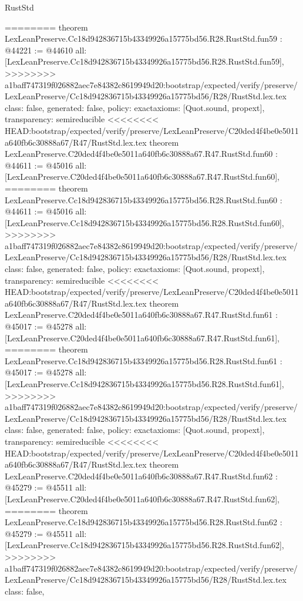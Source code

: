 \begin{lexlean}{RustStd}
\begin{coremodule}
{\begin{coremodule}
{{{{{{{{{{{{{{{{{{{{{{{{{{{{{{{{{{{{{{{{{{{{{{{{{{{{{{{{{{{{{{========
theorem LexLeanPreserve.Cc18d942836715b43349926a15775bd56.R28.RustStd.fun59 : @44221 := @44610 {
  all: [LexLeanPreserve.Cc18d942836715b43349926a15775bd56.R28.RustStd.fun59],
>>>>>>>> a1baff747319f026882aec7e84382c8619949d20:bootstrap/expected/verify/preserve/LexLeanPreserve/Cc18d942836715b43349926a15775bd56/R28/RustStd.lex.tex
  class: false,
  generated: false,
  policy: exact{axioms: [Quot.sound, propext]},
  transparency: semireducible
}
<<<<<<<< HEAD:bootstrap/expected/verify/preserve/LexLeanPreserve/C20ded4f4be0e5011a640fb6c30888a67/R47/RustStd.lex.tex
theorem LexLeanPreserve.C20ded4f4be0e5011a640fb6c30888a67.R47.RustStd.fun60 : @44611 := @45016 {
  all: [LexLeanPreserve.C20ded4f4be0e5011a640fb6c30888a67.R47.RustStd.fun60],
========
theorem LexLeanPreserve.Cc18d942836715b43349926a15775bd56.R28.RustStd.fun60 : @44611 := @45016 {
  all: [LexLeanPreserve.Cc18d942836715b43349926a15775bd56.R28.RustStd.fun60],
>>>>>>>> a1baff747319f026882aec7e84382c8619949d20:bootstrap/expected/verify/preserve/LexLeanPreserve/Cc18d942836715b43349926a15775bd56/R28/RustStd.lex.tex
  class: false,
  generated: false,
  policy: exact{axioms: [Quot.sound, propext]},
  transparency: semireducible
}
<<<<<<<< HEAD:bootstrap/expected/verify/preserve/LexLeanPreserve/C20ded4f4be0e5011a640fb6c30888a67/R47/RustStd.lex.tex
theorem LexLeanPreserve.C20ded4f4be0e5011a640fb6c30888a67.R47.RustStd.fun61 : @45017 := @45278 {
  all: [LexLeanPreserve.C20ded4f4be0e5011a640fb6c30888a67.R47.RustStd.fun61],
========
theorem LexLeanPreserve.Cc18d942836715b43349926a15775bd56.R28.RustStd.fun61 : @45017 := @45278 {
  all: [LexLeanPreserve.Cc18d942836715b43349926a15775bd56.R28.RustStd.fun61],
>>>>>>>> a1baff747319f026882aec7e84382c8619949d20:bootstrap/expected/verify/preserve/LexLeanPreserve/Cc18d942836715b43349926a15775bd56/R28/RustStd.lex.tex
  class: false,
  generated: false,
  policy: exact{axioms: [Quot.sound, propext]},
  transparency: semireducible
}
<<<<<<<< HEAD:bootstrap/expected/verify/preserve/LexLeanPreserve/C20ded4f4be0e5011a640fb6c30888a67/R47/RustStd.lex.tex
theorem LexLeanPreserve.C20ded4f4be0e5011a640fb6c30888a67.R47.RustStd.fun62 : @45279 := @45511 {
  all: [LexLeanPreserve.C20ded4f4be0e5011a640fb6c30888a67.R47.RustStd.fun62],
========
theorem LexLeanPreserve.Cc18d942836715b43349926a15775bd56.R28.RustStd.fun62 : @45279 := @45511 {
  all: [LexLeanPreserve.Cc18d942836715b43349926a15775bd56.R28.RustStd.fun62],
>>>>>>>> a1baff747319f026882aec7e84382c8619949d20:bootstrap/expected/verify/preserve/LexLeanPreserve/Cc18d942836715b43349926a15775bd56/R28/RustStd.lex.tex
  class: false,
}}}}}}}}}}}}}}}}}}}}}}}}}}}}}}}}}}}}}}}}}}}}}}}}}}}}}}}}}}}}}}}}}}
\end{coremodule}}
\end{coremodule}
\end{lexlean}
